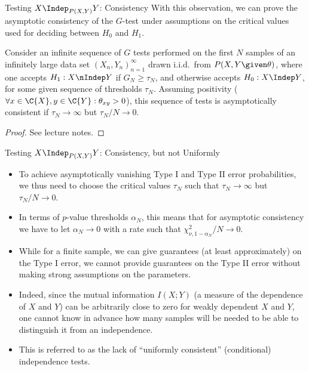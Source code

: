 \begin{frame}{Testing $X \Indep_{P(X,Y)} Y$: Consistency}
With this observation, we can prove the asymptotic consistency of the $G$-test under assumptions on the critical values used
for deciding between $H_0$ and $H_1$. 
\begin{Cor}
Consider an infinite sequence of $G$ tests performed on the first $N$ samples of an infinitely large
data set $(X_n,Y_n)_{n=1}^\infty$ drawn i.i.d.\ from $P(X,Y \given \theta)$, 
where one accepts $H_1 : X \nIndep Y$ if $G_N \ge \tau_N$, and otherwise accepts $H_0 : X \Indep Y$, 
for some given sequence of thresholds $\tau_N$.
Assuming positivity ($\forall x \in \C{X}, y\in \C{Y}: \theta_{xy} > 0$), 
this sequence of tests is asymptotically consistent if $\tau_N \to \infty$ but $\tau_N / N \to 0$.
\end{Cor}
\begin{proof}
See lecture notes.
\end{proof}
\end{frame}

\begin{frame}{Testing $X \Indep_{P(X,Y)} Y$: Consistency, but not Uniformly}
  \begin{itemize}
    \item To achieve asymptotically vanishing Type I and Type II error probabilities, we thus need 
      to choose the critical values $\tau_N$ such that $\tau_N \to \infty$ but $\tau_N / N \to 0$.
    \item In terms of $p$-value thresholds $\alpha_N$, this means that for asymptotic consistency we have to let
       $\alpha_N \to 0$ with a rate such that $\chi^2_{\nu,1-\alpha_N} / N \to 0$.
    \item While for a finite sample, we can give guarantees (at least approximately) on the Type I error, we cannot
      provide guarantees on the Type II error without making strong assumptions on the parameters. 
    \item Indeed, since the mutual information $I(X;Y)$ (a measure of
the dependence of $X$ and $Y$) can be arbitrarily close to zero for weakly dependent $X$ 
and $Y$, one cannot know in advance how many samples will be needed to be able to distinguish
it from an independence.
    \item This is referred to as the lack of ``uniformly consistent'' (conditional) independence tests.
  \end{itemize}
\end{frame}


